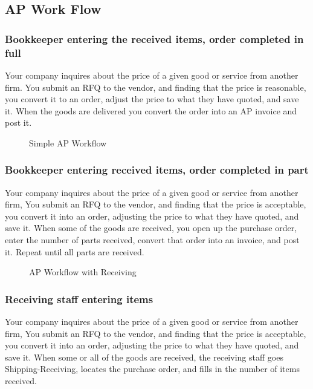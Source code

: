 \documentclass{article}
\begin{document}
\subsection{AP Work Flow}
\subsubsection{Bookkeeper entering the received items, order completed in full}

Your company inquires about the price of a given good or service from another
firm.  You submit an RFQ to the vendor, and finding that the price is
reasonable, you convert it to an order, adjust the price to what they have
quoted, and save it.  When the goods are delivered you convert the
order into an AP invoice and post it.


\begin{figure}[hbtp]
\caption{Simple AP Workflow}

\end{figure}

\subsubsection{Bookkeeper entering received items, order completed in part}

Your company inquires about the price of a given good or service from another
firm,  You submit an RFQ to the vendor, and finding that the price is
acceptable, you convert it into an order, adjusting the price to what they have
quoted, and save it.  When some of the goods are received, you open up the
purchase order, enter the number of parts received, convert that order into
an invoice, and post it.  Repeat until all parts are received.

\begin{figure}[hbtp]
\caption{AP Workflow with Receiving}

\end{figure}

\subsubsection{Receiving staff entering items}

Your company inquires about the price of a given good or service from another
firm,  You submit an RFQ to the vendor, and finding that the price is
acceptable, you convert it into an order, adjusting the price to what they have
quoted, and save it.  When some or all of the goods are received, the receiving
staff goes Shipping-Receiving, locates the purchase order, and fills in the
number of items received.  
\end{document}

